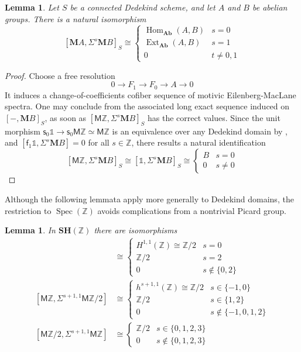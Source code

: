 \documentclass[11pt,hyp,english]{article}
\newcommand{\Z}{\mathbb{Z}}
\newcommand{\unit}{\mathds{1}}
\newcommand{\MZ}{\mathsf{M}\Z}
\newcommand{\MA}{\mathbf{M}A}
\newcommand{\MB}{\mathbf{M}B}
\newcommand{\SH}{\mathbf{SH}}
\newcommand{\Ab}{\mathbf{Ab}}
\newcommand{\Hom}{\operatorname{Hom}}
\newcommand{\Ext}{\operatorname{Ext}}
\newcommand{\Spec}{\operatorname{Spec}}
\newcommand{\s}{\mathsf{s}}
\newcommand{\f}{\mathsf{f}}
\let\iso=\cong
\newtheorem{lemma}[theorem]{Lemma}
\theoremstyle{definition}
\begin{document}
\begin{lemma}\label{lem:endo-mz-weight0}
Let $S$ be a connected Dedekind scheme, and let $A$ and $B$ be abelian groups.
There is a natural isomorphism
\[
[\MA,\Sigma^{s}\MB]_S \cong \begin{cases}
\Hom_{\Ab}(A,B) & s = 0 \\
\Ext_{\Ab}(A,B) & s = 1\\
0 & t \neq 0, 1
\end{cases}
\]
\end{lemma}
\begin{proof}
Choose a free resolution
\[ 0 \to F_1\to F_0 \to A\to 0\]
It induces a change-of-coefficients cofiber sequence of motivic Eilenberg-MacLane spectra.
One may conclude from the associated long exact sequence induced on $[-,\MB]_S$, as soon as $[\MZ,\Sigma^s\MB]_S$ has the correct values.
Since the unit morphism $\s_0\unit\to \s_0\MZ\simeq \MZ$ is an equivalence over any Dedekind domain by \cite[Theorem B.5]{bachmann-hoyois}, and $[\f_1\unit,\Sigma^s\MB]=0$ for all $s\in \Z$, there results a natural identification
\[ [\MZ,\Sigma^s\MB]_S\cong [\unit,\Sigma^s\MB]_S\cong \begin{cases} B & s=0 \\ 0 & s\neq 0 \end{cases}\]
\end{proof}

Although the following lemmata apply more generally to Dedekind domains, the restriction to $\Spec(\mathbb{Z})$ avoids complications from a nontrivial Picard group.


\begin{lemma}\label{lem:endo-mz-weight1}
In $\SH(\Z)$ there are isomorphisms
\begin{align*}
[\MZ,\Sigma^{s+1,1}\MZ] &\iso  \begin{cases} H^{1,1}(\Z) \iso \Z/2 & s=0 \\
\Z/2 & s=2 \\
0 & s\notin \{0,2\} \end{cases}
\\
[\MZ,\Sigma^{s+1,1}\MZ/2] &\iso  \begin{cases} h^{s+1,1}(\Z) \iso \Z/2 & s\in \{-1,0\} \\
\Z/2 & s\in \{1,2\} \\
0 & s\notin \{-1,0,1,2\} \end{cases}
\\
[\MZ/2,\Sigma^{s+1,1}\MZ] &\iso \begin{cases} \Z/2 & s\in \{0,1,2,3\} \\ 
0 & s\notin \{0,1,2,3\} \end{cases}
\end{align*}
\end{lemma}
\end{document}
